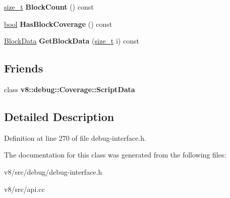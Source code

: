 \begin{DoxyCompactItemize}
\mbox{\hyperlink{classsize__t}{size\+\_\+t}} {\bfseries Block\+Count} () const
\item 
\mbox{\label{classv8_1_1debug_1_1Coverage_1_1FunctionData_a1c5ff97f77de6f2b79ce262afd2fa263}} 
\mbox{\hyperlink{classbool}{bool}} {\bfseries Has\+Block\+Coverage} () const
\item 
\mbox{\label{classv8_1_1debug_1_1Coverage_1_1FunctionData_a185a039d70e504ecf99bbaa7cde6db34}} 
\mbox{\hyperlink{classv8_1_1debug_1_1Coverage_1_1BlockData}{Block\+Data}} {\bfseries Get\+Block\+Data} (\mbox{\hyperlink{classsize__t}{size\+\_\+t}} i) const
\end{DoxyCompactItemize}
\subsection*{Friends}
\begin{DoxyCompactItemize}
\item 
\mbox{\label{classv8_1_1debug_1_1Coverage_1_1FunctionData_a1ed2c577b3ab2da73f5efe4b1484192d}} 
class {\bfseries v8\+::debug\+::\+Coverage\+::\+Script\+Data}
\end{DoxyCompactItemize}


\subsection{Detailed Description}


Definition at line 270 of file debug-\/interface.\+h.



The documentation for this class was generated from the following files\+:\begin{DoxyCompactItemize}
\item 
v8/src/debug/debug-\/interface.\+h\item 
v8/src/api.\+cc\end{DoxyCompactItemize}
